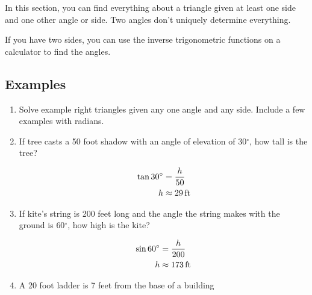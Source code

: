 \documentclass{exam}
\newcommand{\dg}{\ensuremath{^\circ}}
\begin{document}
  In this section, you can find everything about a triangle given at least one side and one other angle or side.  Two
  angles don't uniquely determine everything.

  If you have two sides, you can use the inverse trigonometric functions on a calculator to find the angles.

  \subsection{Examples}

  \begin{enumerate}
    \item Solve example right triangles given any one angle and any side.  Include a few examples with radians.

    \item If tree casts a 50 foot shadow with an angle of elevation of $30 \dg$, how tall is the tree?
      \begin{solution}
        \begin{align*}
          \tan 30 \dg & = \frac{h}{50} \\
          h           & \approx \unit[29]{ft} \\
        \end{align*}
      \end{solution}

    \item If kite's string is 200 feet long and the angle the string makes with the ground is $60 \dg$, how high is the
      kite?
      \begin{solution}
        \begin{align*}
          \sin 60 \dg & = \frac{h}{200} \\
          h           & \approx \unit[173]{ft} \\
        \end{align*}
      \end{solution}

    \item A 20 foot ladder is 7 feet from the base of a building
\end{enumerate}
\end{document}
